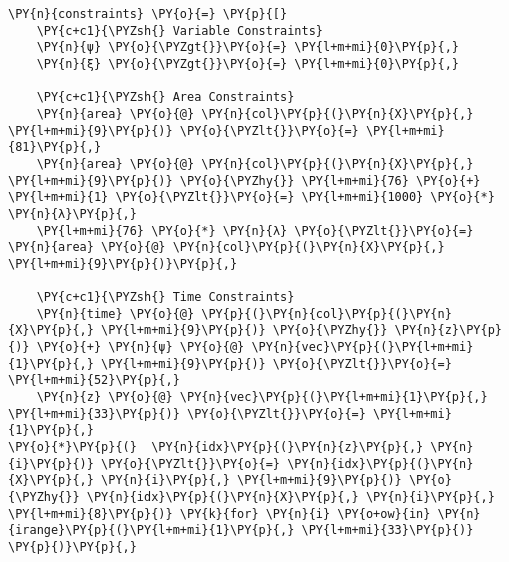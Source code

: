 \begin{tcolorbox}[breakable, size=fbox, boxrule=1pt, pad at break*=1mm,colback=cellbackground, colframe=cellborder]
    \begin{Verbatim}[commandchars=\\\{\}]
\PY{n}{constraints} \PY{o}{=} \PY{p}{[}
    \PY{c+c1}{\PYZsh{} Variable Constraints}
    \PY{n}{ψ} \PY{o}{\PYZgt{}}\PY{o}{=} \PY{l+m+mi}{0}\PY{p}{,}
    \PY{n}{ξ} \PY{o}{\PYZgt{}}\PY{o}{=} \PY{l+m+mi}{0}\PY{p}{,}

    \PY{c+c1}{\PYZsh{} Area Constraints}
    \PY{n}{area} \PY{o}{@} \PY{n}{col}\PY{p}{(}\PY{n}{X}\PY{p}{,} \PY{l+m+mi}{9}\PY{p}{)} \PY{o}{\PYZlt{}}\PY{o}{=} \PY{l+m+mi}{81}\PY{p}{,}
    \PY{n}{area} \PY{o}{@} \PY{n}{col}\PY{p}{(}\PY{n}{X}\PY{p}{,} \PY{l+m+mi}{9}\PY{p}{)} \PY{o}{\PYZhy{}} \PY{l+m+mi}{76} \PY{o}{+} \PY{l+m+mi}{1} \PY{o}{\PYZlt{}}\PY{o}{=} \PY{l+m+mi}{1000} \PY{o}{*} \PY{n}{λ}\PY{p}{,}
    \PY{l+m+mi}{76} \PY{o}{*} \PY{n}{λ} \PY{o}{\PYZlt{}}\PY{o}{=} \PY{n}{area} \PY{o}{@} \PY{n}{col}\PY{p}{(}\PY{n}{X}\PY{p}{,} \PY{l+m+mi}{9}\PY{p}{)}\PY{p}{,}

    \PY{c+c1}{\PYZsh{} Time Constraints}
    \PY{n}{time} \PY{o}{@} \PY{p}{(}\PY{n}{col}\PY{p}{(}\PY{n}{X}\PY{p}{,} \PY{l+m+mi}{9}\PY{p}{)} \PY{o}{\PYZhy{}} \PY{n}{z}\PY{p}{)} \PY{o}{+} \PY{n}{ψ} \PY{o}{@} \PY{n}{vec}\PY{p}{(}\PY{l+m+mi}{1}\PY{p}{,} \PY{l+m+mi}{9}\PY{p}{)} \PY{o}{\PYZlt{}}\PY{o}{=} \PY{l+m+mi}{52}\PY{p}{,}
    \PY{n}{z} \PY{o}{@} \PY{n}{vec}\PY{p}{(}\PY{l+m+mi}{1}\PY{p}{,} \PY{l+m+mi}{33}\PY{p}{)} \PY{o}{\PYZlt{}}\PY{o}{=} \PY{l+m+mi}{1}\PY{p}{,}
\PY{o}{*}\PY{p}{(}  \PY{n}{idx}\PY{p}{(}\PY{n}{z}\PY{p}{,} \PY{n}{i}\PY{p}{)} \PY{o}{\PYZlt{}}\PY{o}{=} \PY{n}{idx}\PY{p}{(}\PY{n}{X}\PY{p}{,} \PY{n}{i}\PY{p}{,} \PY{l+m+mi}{9}\PY{p}{)} \PY{o}{\PYZhy{}} \PY{n}{idx}\PY{p}{(}\PY{n}{X}\PY{p}{,} \PY{n}{i}\PY{p}{,} \PY{l+m+mi}{8}\PY{p}{)} \PY{k}{for} \PY{n}{i} \PY{o+ow}{in} \PY{n}{irange}\PY{p}{(}\PY{l+m+mi}{1}\PY{p}{,} \PY{l+m+mi}{33}\PY{p}{)}  \PY{p}{)}\PY{p}{,}


\end{Verbatim}
\end{tcolorbox}
